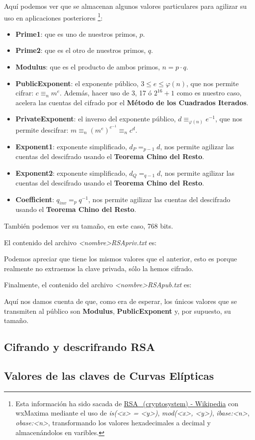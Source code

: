 \documentclass[a4paper, 11pt]{article}
\begin{document}
		Aquí podemos ver que se almacenan algunos valores particulares para agilizar su uso en aplicaciones posteriores
		\footnote{Esta información ha sido sacada de \href{https://en.wikipedia.org/wiki/RSA\_(cryptosystem)\#Using\_the\_Chinese\_remainder\_algorithm}
		{RSA\_(cryptosystem) - Wikipedia}  con wxMaxima mediante el uso de \textit{is(<x> = <y>)}, \textit{mod(<x>, <y>)},
		\textit{ibase:<n>}, \textit{obase:<n>}, transformando los valores hexadecimales a decimal y almacenándolos en varibles.}:
		\begin{itemize}
			\item \textbf{Prime1}: que es uno de nuestros primos, $p$.
			\item \textbf{Prime2}: que es el otro de nuestros primos, $q$.
			\item \textbf{Modulus}: que es el producto de ambos primos, $n = p \cdot q$.
			\item \textbf{PublicExponent}: el exponente público, $3 \le e \le \varphi(n)$, que nos permite cifrar: $c \equiv_n m^e$.
			Además, hacer uso de 3, 17 ó $2^{16}+1$ como es nuestro caso, acelera las cuentas del cifrado por el \textbf{Método
			de los Cuadrados Iterados}.
			\item \textbf{PrivateExponent}: el inverso del exponente público, $d \equiv_{\varphi(n)} e^{-1}$, que nos
			permite descifrar: $m \equiv_n (m^e)^{e^{-1}}\equiv_n c^d$.
			\item \textbf{Exponent1}: exponente simplificado, $d_P =_{p-1} d$, nos permite agilizar las cuentas del descifrado
			usando el \textbf{Teorema Chino del Resto}.
			\item \textbf{Exponent2}: exponente simplificado, $d_Q =_{q-1} d$, nos permite agilizar las cuentas del descifrado
			usando el \textbf{Teorema Chino del Resto}.
			\item \textbf{Coefficient}: $q_{inv} =_{p} q^{-1}$, nos permite agilizar las cuentas del descifrado usando el
			\textbf{Teorema Chino del Resto}.
		\end{itemize}
		
		También podemos ver su tamaño, en este caso, 768 bits.
		
		El contenido del archivo \textit{<nombre>RSApriv.txt} es:
		
		
		Podemos apreciar que tiene los mismos valores que el anterior, esto es porque realmente no extraemos la clave privada,
		sólo la hemos cifrado.
		
		Finalmente, el contenido del archivo \textit{<nombre>RSApub.txt} es:
		
		
		Aquí nos damos cuenta de que, como era de esperar, los únicos valores que se transmiten al público son \textbf{Modulus},
		\textbf{PublicExponent} y, por supuesto, su tamaño.
		
	\subsection{Cifrando y descrifrando RSA}
	
	\subsection{Valores de las claves de Curvas Elípticas}
	
\end{document}
